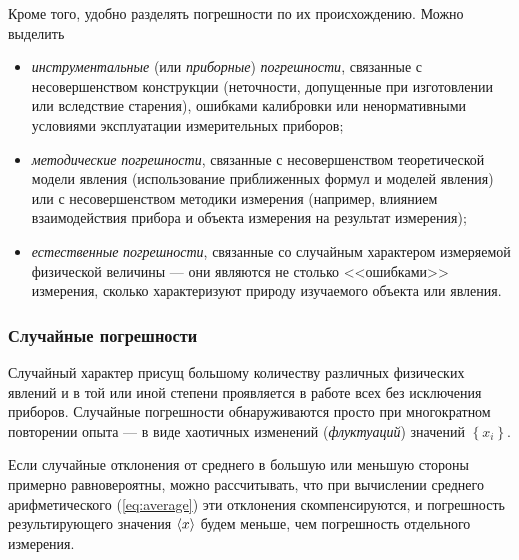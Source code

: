 Кроме того, удобно разделять погрешности по их происхождению. Можно
выделить
\begin{itemize}
    \item \emph{инструментальные} (или \emph{приборные}) \emph{погрешности},
связанные с несовершенством конструкции (неточности, допущенные при
изготовлении или вследствие старения), ошибками калибровки или ненормативными
условиями эксплуатации измерительных приборов;
    \item \emph{методические} \emph{погрешности}, связанные с несовершенством
теоретической модели явления (использование приближенных формул и
моделей явления) или с несовершенством методики измерения (например,
влиянием взаимодействия прибора и объекта измерения на результат измерения);
    \item \emph{естественные} \emph{погрешности}, связанные со случайным характером
измеряемой физической величины --- они являются не столько
<<ошибками>> измерения, сколько характеризуют
природу изучаемого объекта или явления.
\end{itemize}


\subsubsection{Случайные погрешности}

Случайный характер присущ большому количеству различных физических
явлений и в той или иной степени проявляется в работе всех без исключения
приборов. Случайные погрешности обнаруживаются просто при многократном
повторении опыта --- в виде хаотичных изменений (\emph{флуктуаций})
значений $\left\{ x_{i}\right\} $.

Если случайные отклонения от среднего в большую или меньшую стороны
примерно равновероятны, можно рассчитывать, что при вычислении среднего
арифметического (\ref{eq:average}) эти отклонения скомпенсируются,
и погрешность результирующего значения $\left<x\right>$ будем меньше,
чем погрешность отдельного измерения.

